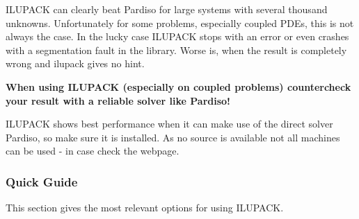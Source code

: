 ILUPACK can clearly beat Pardiso for large systems with several thousand
unknowns. Unfortunately for some problems, especially coupled PDEs, this is 
not always the case. In the lucky case ILUPACK stops with an error or even
crashes with a segmentation fault in the library. Worse is, when the result is
completely wrong and ilupack gives no hint.

\textbf{When using ILUPACK (especially on coupled problems) countercheck your
result with a reliable solver like Pardiso!}

ILUPACK shows best performance when it can make use of the direct solver
Pardiso, so make sure it is installed. As no source is available not all
machines can be used - in case check the webpage.

\subsubsection*{Quick Guide}
This section gives the most relevant options for using ILUPACK.
